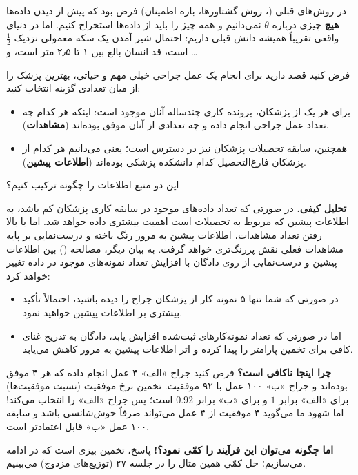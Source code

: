 در روش‌های قبلی (، روش گشتاورها، بازه اطمینان) فرض بود که پیش از دیدن داده‌ها \textbf{هیچ} چیزی درباره $\theta$ نمی‌دانیم و همه چیز را باید از داده‌ها استخراج کنیم. اما در دنیای واقعی تقریباً همیشه دانش قبلی داریم: احتمال شیر آمدن یک سکه معمولی نزدیک $\frac12$ است، قد انسان بالغ بین ۱ تا ۲٫۵ متر است، و \ldots

\begin{example}
فرض کنید قصد دارید برای انجام یک عمل جراحی خیلی مهم و حیاتی، بهترین پزشک را از میان تعدادی گزینه انتخاب کنید:
\begin{itemize}
\item برای هر یک از پزشکان، پرونده کاری چندساله آنان موجود است: اینکه هر کدام چه تعداد عمل جراحی انجام داده و چه تعدادی از آنان موفق بوده‌اند (\textbf{مشاهدات}).
\item همچنین، سابقه تحصیلات پزشکان نیز در دسترس است؛ یعنی می‌دانیم هر کدام از پزشکان فارغ‌التحصیل کدام دانشکده پزشکی بوده‌اند (\textbf{اطلاعات پیشین}).
\end{itemize}
این دو منبع اطلاعات را چگونه ترکیب کنیم؟
\begin{solution}
\textbf{تحلیل کیفی.} در صورتی که تعداد داده‌های موجود در سابقه کاری پزشکان کم باشد، به اطلاعات پیشین که مربوط به تحصیلات است اهمیت بیشتری داده خواهد شد. اما با بالا رفتن تعداد مشاهدات، اطلاعات پیشین به مرور رنگ باخته و درست‌نمایی بر پایه مشاهدات فعلی نقش پررنگ‌تری خواهد گرفت. به بیان دیگر، مصالحه () بین اطلاعات پیشین و درست‌نمایی از روی دادگان با افزایش تعداد نمونه‌های موجود در داده تغییر خواهد کرد:
\begin{itemize}
\item در صورتی که شما تنها ۵ نمونه کار از پزشکان جراح را دیده باشید، احتمالاً تأکید بیشتری بر اطلاعات پیشین خواهید نمود.
\item اما در صورتی که تعداد نمونه‌کارهای ثبت‌شده افزایش یابد، دادگان به تدریج غنای کافی برای تخمین پارامتر را پیدا کرده و اثر اطلاعات پیشین به مرور کاهش می‌یابد.
\end{itemize}
\textbf{چرا  اینجا ناکافی است؟} فرض کنید جراح «الف» ۴ عمل انجام داده که هر ۴ موفق بوده‌اند و جراح «ب» ۱۰۰ عمل با ۹۲ موفقیت. تخمین  نرخ موفقیت (نسبت موفقیت‌ها) برای «الف» برابر $1$ و برای «ب» برابر $0.92$ است؛ پس  جراح «الف» را انتخاب می‌کند! اما شهود ما می‌گوید ۴ موفقیت از ۴ عمل می‌تواند صرفاً خوش‌شانسی باشد و سابقه ۱۰۰ عمل «ب» قابل اعتمادتر است.

\textbf{اما چگونه می‌توان این فرآیند را کمّی نمود؟!} پاسخ، تخمین بیزی است که در ادامه می‌سازیم؛ حل کمّی همین مثال را در جلسه ۲۷ (توزیع‌های مزدوج) می‌بینیم.
\end{solution}
\end{example}

